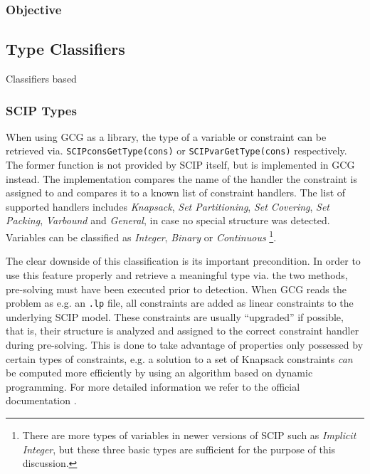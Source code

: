 			\subsubsection{Objective}

				
			
				\clearpage
		
		\subsection{Type Classifiers}
		\label{chap:gcg:classifiers:type}
		
			Classifiers based 
			
			\subsubsection{SCIP Types}
			
				When using \ac{GCG} as a library, the type of a variable or constraint can be retrieved via. \lstinline|SCIPconsGetType(cons)| or \lstinline|SCIPvarGetType(cons)| respectively.
				The former function is not provided by \ac{SCIP} itself, but is implemented in \ac{GCG} instead.
				The implementation compares the name of the handler the constraint is assigned to and compares it to a known list of constraint handlers. 
				The list of supported handlers includes \emph{Knapsack}, \emph{Set Partitioning}, \emph{Set Covering}, \emph{Set Packing}, \emph{Varbound} and \emph{General}, in case no special structure was detected. 
				Variables can be classified as \emph{Integer}, \emph{Binary} or \emph{Continuous}
				\footnote{There are more types of variables in newer versions of \ac{SCIP} such as \emph{Implicit Integer}, but these three basic types are sufficient for the purpose of this discussion.}.
				
				The clear downside of this classification is its important precondition.
				In order to use this feature properly and retrieve a meaningful type via. the two methods, pre-solving must have been executed prior to detection.
				When \ac{GCG} reads the problem as e.g. an \lstinline|.lp| file, all constraints are added as linear constraints to the underlying \ac{SCIP} model.
				These constraints are usually \enquote{upgraded} if possible, that is, their structure is analyzed and assigned to the correct constraint handler during pre-solving.
				This is done to take advantage of properties only possessed by certain types of constraints, e.g. a solution to a set of Knapsack constraints \textit{can} be computed more efficiently by using an algorithm based on dynamic programming.
				For more detailed information we refer to the official documentation \cite{SCIPDoxygenDocumentation}.
				
